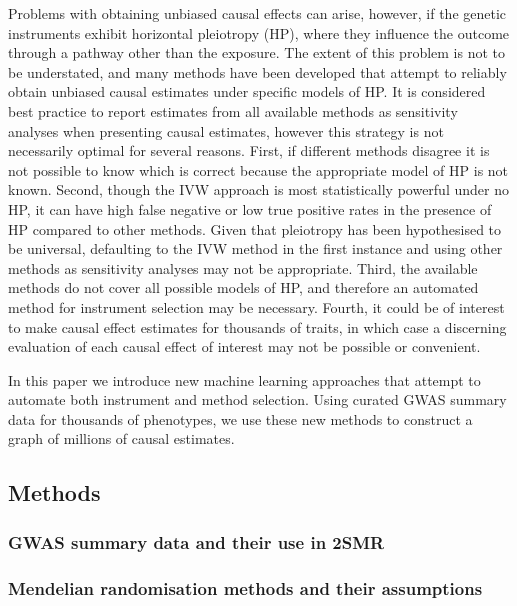 \documentclass[]{article}
\begin{document}
Problems with obtaining unbiased causal effects can arise, however, if
the genetic instruments exhibit horizontal pleiotropy (HP), where they
influence the outcome through a pathway other than the exposure. The
extent of this problem is not to be understated, and many methods have
been developed that attempt to reliably obtain unbiased causal estimates
under specific models of HP. It is considered best practice to report
estimates from all available methods as sensitivity analyses when
presenting causal estimates, however this strategy is not necessarily
optimal for several reasons. First, if different methods disagree it is
not possible to know which is correct because the appropriate model of
HP is not known. Second, though the IVW approach is most statistically
powerful under no HP, it can have high false negative or low true
positive rates in the presence of HP compared to other methods. Given
that pleiotropy has been hypothesised to be universal, defaulting to the
IVW method in the first instance and using other methods as sensitivity
analyses may not be appropriate. Third, the available methods do not
cover all possible models of HP, and therefore an automated method for
instrument selection may be necessary. Fourth, it could be of interest
to make causal effect estimates for thousands of traits, in which case a
discerning evaluation of each causal effect of interest may not be
possible or convenient.

In this paper we introduce new machine learning approaches that attempt
to automate both instrument and method selection. Using curated GWAS
summary data for thousands of phenotypes, we use these new methods to
construct a graph of millions of causal estimates.

\subsection{Methods}\label{methods}

\subsubsection{GWAS summary data and their use in
2SMR}\label{gwas-summary-data-and-their-use-in-2smr}

\subsubsection{Mendelian randomisation methods and their
assumptions}\label{mendelian-randomisation-methods-and-their-assumptions}
\end{document}
